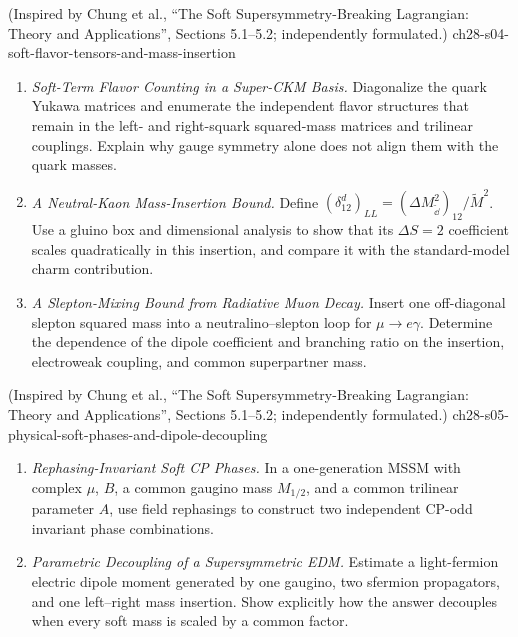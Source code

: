 \begin{enumerate}
    {(Inspired by Chung et al., ``The Soft Supersymmetry-Breaking Lagrangian: Theory and Applications'', Sections 5.1--5.2; independently formulated.)}
    {ch28-s04-soft-flavor-tensors-and-mass-insertion}
  \begin{enumerate}
    \item \emph{Soft-Term Flavor Counting in a Super-CKM Basis.}
    Diagonalize the quark Yukawa matrices and enumerate the independent
      flavor structures that remain in the left- and right-squark squared-mass
      matrices and trilinear couplings.  Explain why gauge symmetry alone does
      not align them with the quark masses.
    \item \emph{A Neutral-Kaon Mass-Insertion Bound.}
    Define \((\delta^d_{12})_{LL}=(\Delta M_{\widetilde \dd}^2)_{12}/
      \widetilde M^2\).  Use a gluino box and dimensional analysis to show
      that its \(\Delta S=2\) coefficient scales quadratically in this
      insertion, and compare it with the standard-model charm contribution.
    \item \emph{A Slepton-Mixing Bound from Radiative Muon Decay.}
    Insert one off-diagonal slepton squared mass into a neutralino--slepton
      loop for \(\mu\to e\gamma\).  Determine the dependence of the dipole
      coefficient and branching ratio on the insertion, electroweak coupling,
      and common superpartner mass.
  \end{enumerate}

    {(Inspired by Chung et al., ``The Soft Supersymmetry-Breaking Lagrangian: Theory and Applications'', Sections 5.1--5.2; independently formulated.)}
    {ch28-s05-physical-soft-phases-and-dipole-decoupling}
  \begin{enumerate}
    \item \emph{Rephasing-Invariant Soft CP Phases.}
    In a one-generation MSSM with complex \(\mu\), \(B\), a common gaugino
      mass \(M_{1/2}\), and a common trilinear parameter \(A\), use field
      rephasings to construct two independent CP-odd invariant phase
      combinations.
    \item \emph{Parametric Decoupling of a Supersymmetric EDM.}
    Estimate a light-fermion electric dipole moment generated by one gaugino,
      two sfermion propagators, and one left--right mass insertion.  Show
      explicitly how the answer decouples when every soft mass is scaled by a
      common factor.
  \end{enumerate}


\end{enumerate}
